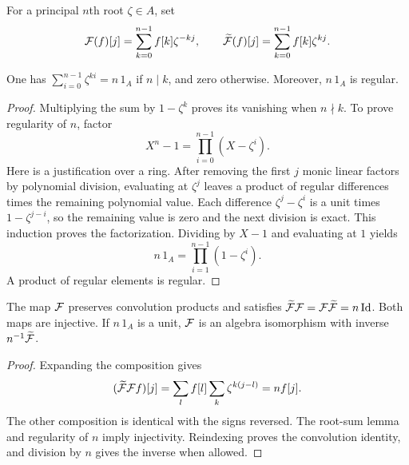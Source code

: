 
\begin{defn}
For a principal $n$th root $\zeta\in A$, set
\begin{equation}
\label{eq-defn-transform-ring}
 \mathcal{F}(f)[j]=\sum_{k=0}^{n-1}f[k]\zeta^{-kj},\qquad
 \widetilde{\mathcal{F}}(f)[j]=\sum_{k=0}^{n-1}f[k]\zeta^{kj}.
\end{equation}
\end{defn}


\begin{lem}
\label{lem-transf-fourier-ring}
One has $\sum_{i=0}^{n-1}\zeta^{ki}=n\,1_A$ if $n\mid k$, and zero
otherwise. Moreover, $n\,1_A$ is regular.
\end{lem}
\begin{proof}
Multiplying the sum by $1-\zeta^k$ proves its vanishing when $n\nmid k$.
To prove regularity of $n$, factor
\[
 X^n-1=\prod_{i=0}^{n-1}(X-\zeta^i).
\]
Here is a justification over a ring. After removing the first $j$ monic
linear factors by polynomial division, evaluating at $\zeta^j$ leaves a
product of regular differences times the remaining polynomial value.
Each difference $\zeta^j-\zeta^i$ is a unit times $1-\zeta^{j-i}$,
so the remaining value is zero and the next division is exact.
This induction proves the factorization. Dividing by $X-1$ and evaluating
at $1$ yields
\[
 n\,1_A=\prod_{i=1}^{n-1}(1-\zeta^i).
\]
A product of regular elements is regular.
\end{proof}


\begin{thm}
The map $\mathcal{F}$ preserves convolution products and satisfies
$\widetilde{\mathcal{F}}\mathcal{F}=\mathcal{F}\widetilde{\mathcal{F}}=n\operatorname{Id}$. Both maps are injective.
If $n\,1_A$ is a unit, $\mathcal{F}$ is an algebra isomorphism with inverse
$n^{-1}\widetilde{\mathcal{F}}$.
\end{thm}
\begin{proof}
Expanding the composition gives
\[
 (\widetilde{\mathcal{F}}\mathcal{F} f)[j]
 =\sum_l f[l]\sum_k\zeta^{k(j-l)}=nf[j].
\]
The other composition is identical with the signs reversed. The root-sum
lemma and regularity of $n$ imply injectivity. Reindexing proves the
convolution identity, and division by $n$ gives the inverse when allowed.
\end{proof}

